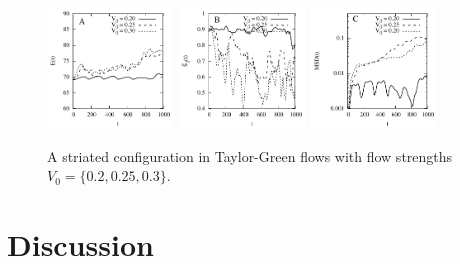 \documentclass[aps,prl,preprint,groupedaddress]{revtex4-2}
\begin{document}
\begin{figure}
  \begin{center}
  \includegraphics[width=0.3\textwidth]{CTG_E.pdf}
   \includegraphics[width=0.3\textwidth]{CTG_LOP.pdf}
    \includegraphics[width=0.3\textwidth]{CTG_MSD.pdf}
  \end{center}
\caption{\label{fig:BC3_TG} A striated configuration in Taylor-Green flows with flow strengths $V_0=\{0.2, 0.25, 0.3\}$.   }
\end{figure}


\section{Discussion}
\end{document}

